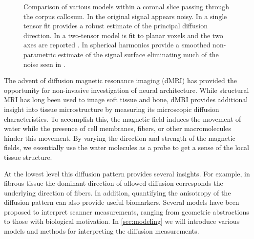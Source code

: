 \documentclass[final,hyperref]{gatech-thesis}
\begin{document}
\begin{figure}[t]
  \centering


 \caption{Comparison of various models within a coronal slice 
   passing through the corpus callosum.  In  the original
   signal appears noisy.  In  a single tensor fit provides a
   robust estimate of the principal diffusion direction.  In  a
   two-tensor model is fit to planar voxels and the two axes are reported
   \cite{Peled2006}.  In  spherical harmonics provide a
   smoothed non-parametric estimate of the signal surface eliminating much of
   the noise seen in  \cite{Descoteaux2007mrm}.}
\end{figure}
The advent of diffusion magnetic resonance imaging (dMRI) has provided the
opportunity for non-invasive investigation of neural architecture.
%
While structural MRI has long been used to image soft tissue and bone, dMRI
provides additional insight into tissue microstructure by measuring its
microscopic diffusion characteristics.
%
To accomplish this, the magnetic field induces the movement of water while the
presence of cell membranes, fibers, or other macromolecules hinder this
movement.  By varying the direction and strength of the magnetic fields, we
essentially use the water molecules as a probe to get a sense of the local
tissue structure.

At the lowest level this diffusion pattern provides several insights.  For
example, in fibrous tissue the dominant direction of allowed diffusion
corresponds the underlying direction of fibers.  In addition, quantifying the
anisotropy of the diffusion pattern can also provide useful biomarkers.
%
Several models have been proposed to interpret scanner measurements, ranging
from geometric abstractions to those with biological motivation.
%
In \autoref{sec:modeling} we will introduce various models and methods for
interpreting the diffusion measurements.
\end{document}
